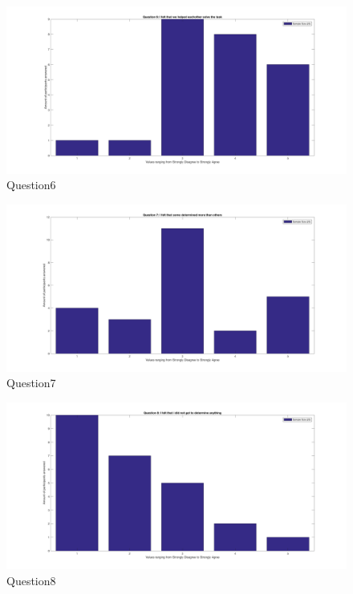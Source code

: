     \begin{figure}[H]
		\centering
		\includegraphics[width=0.9\linewidth]{figure/Appendices/Question6} 
		\caption{Question6}
	\end{figure}

    \begin{figure}[H]
		\centering
		\includegraphics[width=0.9\linewidth]{figure/Appendices/Question7} 
		\caption{Question7}
	\end{figure}

    \begin{figure}[H]
		\centering
		\includegraphics[width=0.9\linewidth]{figure/Appendices/Question8} 
		\caption{Question8}
	\end{figure}


